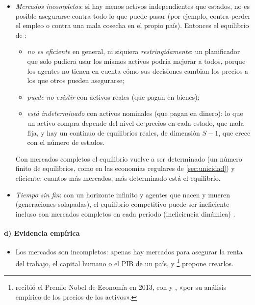 \documentclass[11pt]{article}
\begin{document}
\begin{itemize}
\item \emph{Mercados incompletos}: si hay menos activos independientes que estados, no es posible asegurarse contra todo lo que puede pasar (por ejemplo, contra perder el empleo o contra una mala cosecha en el propio país). Entonces el equilibrio de :
  \begin{itemize}
  \item \emph{no es eficiente} en general, ni siquiera \emph{restringidamente}: un planificador que solo pudiera usar los mismos activos podría mejorar a todos, porque los agentes no tienen en cuenta cómo sus decisiones cambian los precios a los que otros pueden asegurarse\nocite{Hart1975Optimality,GeanakoplosPolemarchakis1986Existence};
  \item \emph{puede no existir} con activos reales (que pagan en bienes)\nocite{Hart1975Optimality};
  \item \emph{está indeterminado} con activos nominales (que pagan en dinero): lo que un activo compra depende del nivel de precios en cada estado, que nada fija, y hay un continuo de equilibrios reales, de dimensión $S-1$, que crece con el número de estados\nocite{BalaskoCass1989Structure,GeanakoplosMasColell1989Real}.
  \end{itemize}
  Con mercados completos el equilibrio vuelve a ser determinado (un número finito de equilibrios, como en las economías regulares de \ref{sec:unicidad}) y eficiente: cuantos más mercados, más determinado está el equilibrio.
\item \emph{Tiempo sin fin}: con un horizonte infinito y agentes que nacen y mueren (generaciones solapadas), el equilibrio competitivo puede ser ineficiente incluso con mercados completos en cada periodo (ineficiencia dinámica) .
\end{itemize}

\paragraph{d) Evidencia empírica}

\begin{itemize}
\item Los mercados son incompletos: apenas hay mercados para asegurar la renta del trabajo, el capital humano o el PIB de un país, y \textcite{Shiller1993Macro}\footnote{ recibió el Premio Nobel de Economía en 2013, con  y , «por su análisis empírico de los precios de los activos»\nocite{Nobel2013FamaHansenShiller}.} propone crearlos.
\end{itemize}
\end{document}
